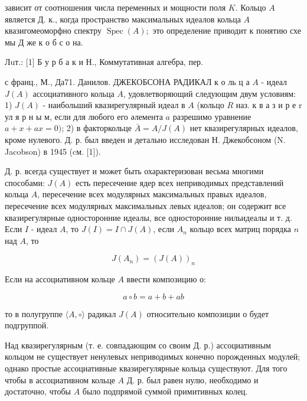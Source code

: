 \documentclass[10pt]{article}
\begin{document}
зависит от соотношения числа переменных и мощности поля $K$. Кольцо $A$ является Д. к., когда пространство максимальных идеалов кольца $A$ квазигомеоморфно спектру $\operatorname{Spec}(A) ;$ это определение приводит к понятию схе мы Д же к о б с о на.



Лuт.: [1] Б у р б а к и Н., Коммутативная алгебра, пер.

с франц., М., Да71. Данилов. ДЖЕКОБСОНА РАДИКАЛ к о ль ц а $A$ - идеал $J(A)$ ассоциативного кольца $A$, удовлетворяющий следующим двум условиям: 1) $J(A)$ - наибольший квазирегулярный идеал в $A$ (кольцо $R$ наз. к в а з и р е r ул я р н ы м, если для любого его әлемента $a$ разрешимо уравнение $a+x+a x=0)$; 2) в факторкольце $\bar{A}=A / J(A)$ нет квазирегулярных идеалов, кроме нулевого. Д. р. был введен и детально исследован Н. Джекобсоном (N. Jacobson) в 1945 (cм. [1]).



Д. р. всегда существует и может быть охарактеризован весьма многими способами: $J(A)$ есть пересечение ядер всех неприводимых представлений кольца $A$, пересечение всех модулярных максимальных правых идеалов, пересечение всех модулярных максимальных левых идеалов; он содержит все квазирегулярные односторонние идеалы, все односторонние нильидеалы и т. д. Если $I$ - идеал $A$, то $J(I)=I \cap J(A)$, если $A_{n}$ кольцо всех матриц порядка $n$ над $A$, то



\[

J\left(A_{n}\right)=(J(A))_{n}

\]



Если на ассоциативном кольце $A$ ввести композицию о:



\[

a \circ b=a+b+a b

\]



то в полугруппе $\langle A, \circ\rangle$ радикал $J(A)$ относительно композиции о будет подгруппой.



Над квазирегулярным (т. е. совпадающим со своим Д. р.) ассоциативным кольцом не существует ненулевых неприводимых конечно порожденных модулей; однако простые ассоциативные квазирегулярные кольца существуют. Для того чтобы в ассоциативном кольце $A$ Д. р. был равен нулю, необходимо и достаточно, чтобы $A$ было подпрямой суммой примитивных колец.
\end{document}

